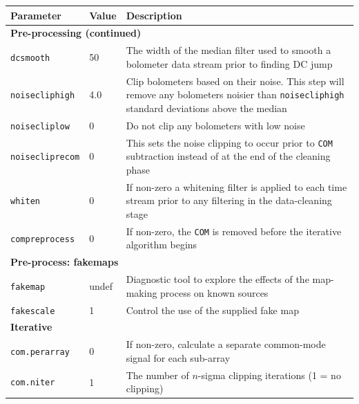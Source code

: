 \documentclass[twoside,11pt]{article}
\newenvironment{latexonly}{}{}
\renewcommand{\_}{\texttt{\symbol{95}}}
\newcommand{\param}[1]{\texttt{#1}}
\newcommand{\model}[1]{\texttt{#1}}
\begin{document}
\begin{latexonly}
\begin{table}
\begin{center}
\begin{small}
\begin{tabular}{|p{2.9cm}|p{1.1cm}|p{10.7cm}|}
\hline
Parameter & Value & Description \\
\hline
\multicolumn{3}{|l|}{\textbf{Pre-processing (continued)}}\\
\hline
\param{dcsmooth}      &   50 & The width of the median filter used to smooth a
                               bolometer data stream prior to finding DC jump \\
\param{noisecliphigh} &  4.0 & Clip bolometers based on their noise. This step
                               will remove any bolometers noisier than
                               \param{noisecliphigh}
                               standard deviations above the median \\
\param{noisecliplow}   &   0 & Do not clip any bolometers with low noise \\
\param{noisecliprecom} &   0 & This sets the noise clipping to occur prior to
                               \model{COM} subtraction instead of at the end of
                               the cleaning phase \\
\param{whiten}         &   0 & If non-zero a whitening filter is applied to each
                               time stream prior to any filtering in the
                               data-cleaning stage \\
\param{compreprocess}  &   0 & If non-zero, the \model{COM} is removed before the
                               iterative algorithm begins \\
\hline
\multicolumn{3}{|l|}{\textbf{Pre-process: fakemaps}}\\
\hline
\param{fakemap}        & undef & Diagnostic tool to explore the effects of the
                                 map-making process on known sources \\
\param{fakescale}      &     1 & Control the use of the supplied fake map \\
\hline
\multicolumn{3}{|l|}{\textbf{Iterative}}\\
\hline
\param{com.perarray}     &      0 & If non-zero, calculate a separate common-mode
                                    signal for each sub-array \\
\param{com.niter}        &      1 & The number of $n$-sigma clipping iterations
                                    (1 = no clipping) \\

\end{tabular}
\end{small}
\end{center}
\end{table}
\end{latexonly}
\end{document}
